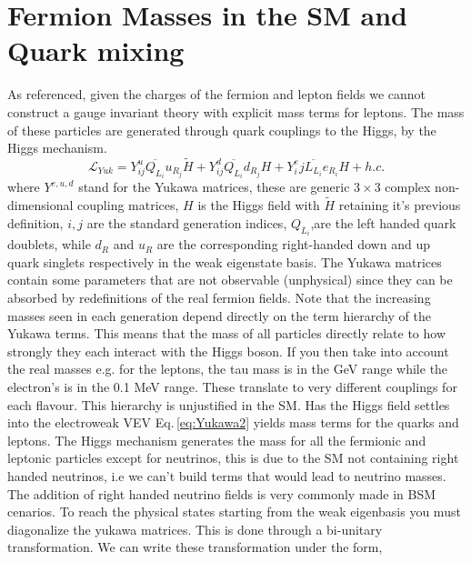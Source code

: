 \renewcommand{\cleardoublepage}{}
\renewcommand{\clearpage}{}

\section{Fermion Masses in the SM and Quark mixing}

As referenced, given the charges of the fermion and lepton fields we cannot construct a gauge invariant theory with explicit mass terms for leptons. 
%
The mass of these particles are generated through quark couplings to the Higgs, by the Higgs mechanism. 
%
\begin{equation} 
\label{eq:Yukawa2}
\mathcal{L}_{Yuk} = Y^u_{ij} \overline{Q_{L_i}} u_{R_j}  \tilde{H} + Y^d_{ij} \overline{Q_{L_i}}  d_{R_j} H  + Y^e_ij \overline{L_{L_i}}  e_{R_i} H + h.c. 
\end{equation} 
%
where $Y^{e,u,d}$ stand for the Yukawa matrices, these are generic $3\times3$ complex non-dimensional coupling matrices, $H$ is the Higgs field with $\tilde{H}$ retaining it's previous definition, $i,j$ are the standard generation indices,{ \color{gray} $Q_{L_i}$,are the left handed quark doublets, while $d_R$ and $u_R$ are the corresponding right-handed down and up quark singlets respectively in the weak eigenstate basis. }
%
{\color{gray} The Yukawa matrices contain some parameters that are not observable (unphysical) since they can be absorbed by redefinitions of the real fermion fields. }
%
Note that the increasing masses seen in each generation depend directly on the term hierarchy of the Yukawa terms. This means that the mass of all particles directly relate to how strongly they each interact with the Higgs boson.
%
If you then take into account the real masses e.g. for the leptons, the tau mass is in the GeV range while the electron's is in the 0.1 MeV range. These translate to very different couplings for each flavour. 
%
This hierarchy is unjustified in the SM. 
%
Has the Higgs field settles into the electroweak VEV Eq.\,\ref{eq:Yukawa2} yields mass terms for the quarks and leptons. 
%
The Higgs mechanism generates the mass for all the fermionic and leptonic particles except for neutrinos, this is due to the SM not containing right handed neutrinos, i.e we can't build terms that would lead to neutrino masses.
% 
The addition of right handed neutrino fields is very commonly made in BSM cenarios. 
%
To reach the physical states starting from the weak eigenbasis you must diagonalize the yukawa matrices. This is done through a bi-unitary transformation. 
% 
We can write these transformation under the form,
